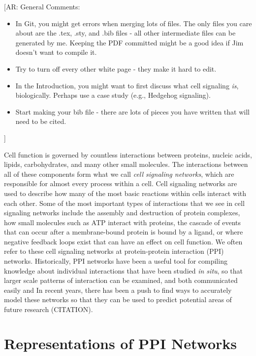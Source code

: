 \documentclass[12pt,twoside]{reedthesis}
\newcommand{\anna}[1]{{\color{blue}[AR: #1]}}
\begin{document}

\anna{General Comments:
\begin{itemize}
\item In Git, you might get errors when merging lots of files.  The only files you care about are the .tex, .sty, and .bib files - all other intermediate files can be generated by me.  Keeping the PDF committed might be a good idea if Jim doesn't want to compile it.
\item Try to turn off every other white page - they make it hard to edit.
\item In the Introduction, you might want to first discuss what cell signaling \textit{is}, biologically.  Perhaps use a case study (e.g., Hedgehog signaling).  
\item Start making your bib file - there are lots of pieces you have written that will need to be cited.   
\end{itemize}}
	
	Cell function is governed by countless interactions between proteins, nucleic acids, lipids, carbohydrates, and many other small molecules.  The interactions between all of these components form what we call \textit{cell signaling networks}, which are responsible for almost every process within a cell.  Cell signaling networks are used to describe how many of the most basic reactions within cells interact with each other.  Some of the most important types of interactions that we see in cell signaling networks include the assembly and destruction of protein complexes, how small molecules such as ATP interact with proteins, the cascade of events that can occur after a membrane-bound protein is bound by a ligand, or where negative feedback loops exist that can have an effect on cell function.  We often refer to these cell signaling networks at protein-protein interaction (PPI) networks.  Historically, PPI networks have been a useful tool for compiling knowledge about individual interactions that have been studied \textit{in situ}, so that larger scale patterns of interaction can be examined, and both communicated easily and   In recent years, there has been a push to find ways to accurately model these networks so that they can be used to predict potential areas of future research (CITATION). 


\section{Representations of PPI Networks}
\end{document}
